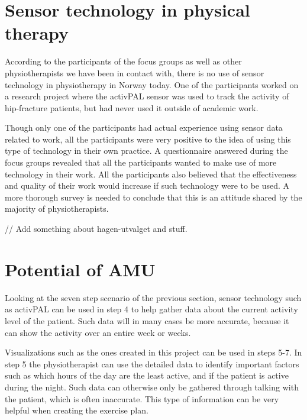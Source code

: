 \section{Sensor technology in physical therapy}
According to the participants of the focus groups as well as other physiotherapists we have been in contact with, there is no use of sensor technology in physiotherapy in Norway today. One of the participants worked on a research project where the activPAL sensor was used to track the activity of hip-fracture patients, but had never used it outside of academic work.

Though only one of the participants had actual experience using sensor data related to work, all the participants were very positive to the idea of using this type of technology in their own practice. A questionnaire answered during the focus groups revealed that all the participants wanted to make use of more technology in their work. All the participants also believed that the effectiveness and quality of their work would increase if such technology were to be used. A more thorough survey is needed to conclude that this is an attitude shared by the majority of physiotherapists.

// Add something about hagen-utvalget and stuff.


\section{Potential of AMU}
Looking at the seven step scenario of the previous section, sensor technology such as activPAL can be used in step 4 to help gather data about the current activity level of the patient. Such data will in many cases be more accurate, because it can show the activity over an entire week or weeks.

Visualizations such as the ones created in this project can be used in steps 5-7. In step 5 the physiotherapist can use the detailed data to identify important factors such as which hours of the day are the least active, and if the patient is active during the night. Such data can otherwise only be gathered through talking with the patient, which is often inaccurate. This type of information can be very helpful when creating the exercise plan.

